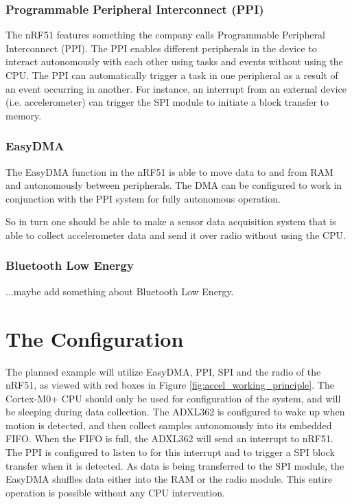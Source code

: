 \subsubsection{Programmable Peripheral Interconnect (PPI)}

The nRF51 features something the company calls Programmable Peripheral Interconnect (PPI). The PPI enables different peripherals in the device to interact autonomously with each other using tasks and events without using the CPU. The PPI can automatically trigger a task in one peripheral as a result of an event occurring in another. For instance, an interrupt from an external device (i.e. accelerometer) can trigger the SPI module to initiate a block transfer to memory. 

\subsubsection{EasyDMA}

The EasyDMA function in the nRF51 is able to move data to and from RAM and autonomously between peripherals. The DMA can be configured to work in conjunction with the PPI system for fully autonomous operation.

So in turn one should be able to make a sensor data acquisition system that is able to collect accelerometer data and send it over radio without using the CPU.

\subsubsection{Bluetooth Low Energy}

...maybe add something about Bluetooth Low Energy.

\section{The Configuration}

The planned example will utilize EasyDMA, PPI, SPI and the radio of the nRF51, as viewed with red boxes in Figure \ref{fig:accel_working_principle}. The Cortex-M0+ CPU should only be used for configuration of the system, and will be sleeping during data collection. The ADXL362 is configured to wake up when motion is detected, and then collect samples autonomously into its embedded FIFO. When the FIFO is full, the ADXL362 will send an interrupt to nRF51. The PPI is configured to listen to for this interrupt and to trigger a SPI block transfer when it is detected. As data is being transferred to the SPI module, the EasyDMA shuffles data either into the RAM or the radio module. This entire operation is possible without any CPU intervention.

